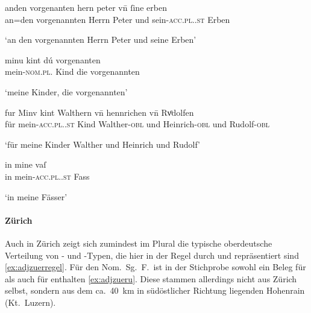 \begin{exe}
\ex \label{ex:adjbaselregel}
	\begin{xlist}
	\ex \label{ex:adjbaselregel_1}
		\gll anden vorgenanten hern peter vn̄ ſine erben \\
			an=den vorgenannten Herrn Peter und sein-\textsc{acc.pl.\MascM.st}
				Erben \\
		\begin{taggedline}{\parencites(Basel, 1293)[\pno~1682, 16.15--16]{cao3}}
		\trans `an den vorgenannten Herrn Peter und seine Erben'
		\end{taggedline}

	\ex \label{ex:adjbaselregel_2}
		\gll minu kint dú vorgenanten \\
			mein-\textsc{nom.pl.\NeutMF} Kind die vorgenannten \\
		\begin{taggedline}{\parencites(Rheinfelden, Kt.~Aargau, 1299)[\pno~3184, 376.13]{cao4}}
		\trans `meine Kinder, die vorgenannten'
		\end{taggedline}
	\end{xlist}

\ex \label{ex:adjbaselu}
	\begin{xlist}
	\ex \label{ex:adjbaselu_1}
		\gll fur Minv kint Walthern vn̄ hennrichen vn̄ Rvͦdolfen \\
			für mein-\textsc{acc.pl.\NeutM.st} Kind Walther-\textsc{obl} und
			Heinrich-\textsc{obl} und Rudolf-\textsc{obl} \\
		\begin{taggedline}{\parencites(Basel, 1289)[\pno~1108, 402.36--37]{cao2}}
		\trans `für meine Kinder Walther und Heinrich und Rudolf'
		\end{taggedline}

	\ex \label{ex:adjbaselu_2}
		\gll in mine vaſ \\
			in mein-\textsc{acc.pl.\NeutI.st} Fass \\
		\begin{taggedline}{\parencites(Mulhouse, Dépt.~Haut-Rhin, 1291)[\pno~N~483, 351.23]{cao5}}
		\trans `in meine Fässer'
		\end{taggedline}
	\end{xlist}
\end{exe}

\paragraph{Zürich}
\label{par:adjzuerich}
Auch in Zürich zeigt sich zumindest im Plural die typische oberdeutsche
Verteilung von - und -Typen, die hier in der Regel durch
 und  repräsentiert sind \cref{ex:adjzuerregel}. Für den Nom.\
Sg.\ F.\ ist in der Stichprobe sowohl ein Beleg für  als auch für
\norm{-e} enthalten \cref{ex:adjzueru}. Diese stammen allerdings nicht aus
Zürich selbst, sondern aus dem ca.\ 40~km in südöstlicher Richtung liegenden
Hohenrain (Kt.~Luzern).

